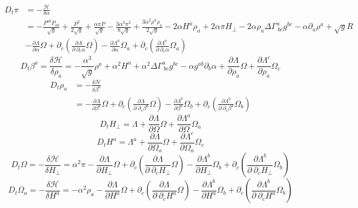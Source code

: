\documentclass{article}
\begin{document}
\begin{align*}
D_{t} \pi & = -\frac{\mathscr{H}}{\delta \alpha}\\
& = - \frac{P^{ab}P_{ab}}{\sqrt{g}} + \frac{P^{2}}{2\sqrt{g}} + \frac{\alpha \pi P}{\sqrt{g}} - \frac{3\alpha^{2}\pi^{2}}{8\sqrt{g}} + \frac{3\alpha^{2}\rho^{a}\rho_{a}}{2\sqrt{g}}- 2\alpha H^{a}\rho_{a} + 2\alpha \pi H_{\perp} - 2\alpha\rho_{a}\Delta \Gamma^{a}_{~bc}g^{bc} - \alpha \partial_{a}\rho^{a} + \sqrt{g}R\\
& - \frac{\partial \Lambda}{\partial \alpha}\Omega + \partial_{c}\left(\frac{\partial \Lambda}{\partial~\partial_{c}\alpha}\Omega\right) - \frac{\partial \Lambda^{a}}{\partial \alpha}\Omega_{a} + \partial_{c}\left(\frac{\partial \Lambda^{a}}{\partial~\partial_{c}\alpha}\Omega_{a}\right)
\end{align*}
\[
D_{t}\beta^{a} = \frac{\delta \mathscr{H}}{\delta \rho_{a}} = -\frac{\alpha^{3}}{\sqrt{g}}\rho^{a} + \alpha^{2}H^{a} + \alpha^{2}\Delta \Gamma^{a}_{~bc}g^{bc} - \alpha g^{ab}\partial_{b}\alpha + \frac{\partial \Lambda}{\partial \rho_{a}}\Omega + \frac{\partial \Lambda^{c}}{\partial \rho_{a}}\Omega_{c}
\]
\begin{align*}
D_{t}\rho_{a} & = -\frac{\delta \mathscr{H}}{\delta \beta^{a}}\\
& =  - \frac{\partial \Lambda}{\partial \beta^{a}}\Omega + \partial_{c}\left(\frac{\partial \Lambda}{\partial~\partial_{c}\beta^{a}}\Omega\right) - \frac{\partial \Lambda^{b}}{\partial \beta^{a}}\Omega_{b} + \partial_{c}\left(\frac{\partial \Lambda^{b}}{\partial~\partial_{c}\beta^{a}}\Omega_{b}\right)
\end{align*}
\[
D_{t} H_{\perp} = \Lambda + \frac{\partial \Lambda}{\partial \Omega}\Omega + \frac{\partial \Lambda^{a}}{\partial \Omega}\Omega_{a}
\]
\[
D_{t} H^{a} = \Lambda^{a} + \frac{\partial \Lambda}{\partial \Omega_{a}}\Omega + \frac{\partial \Lambda^{c}}{\partial \Omega_{a}}\Omega_{c}
\]
\[
D_{t} \Omega = -\frac{\delta \mathscr{H}}{\delta H_{\perp}} = \alpha^{2}\pi - \frac{\partial \Lambda}{\partial H_{\perp}}\Omega + \partial_{c}\left(\frac{\partial \Lambda}{\partial~\partial_{c}H_{\perp}}\Omega\right) - \frac{\partial \Lambda^{b}}{\partial H_{\perp}}\Omega_{b} + \partial_{c}\left(\frac{\partial \Lambda^{b}}{\partial~\partial_{c}H_{\perp}}\Omega_{b}\right)
\]
\[
D_{t} \Omega_{a} = -\frac{\delta \mathscr{H}}{\delta H^{a}} = -\alpha^{2}\rho_{a} - \frac{\partial \Lambda}{\partial H^{a}}\Omega + \partial_{c}\left(\frac{\partial \Lambda}{\partial~\partial_{c}H^{a}}\Omega\right) - \frac{\partial \Lambda^{b}}{\partial H^{a}}\Omega_{b} + \partial_{c}\left(\frac{\partial \Lambda^{b}}{\partial~\partial_{c}H^{a}}\Omega_{b}\right)
\]
\end{document}

